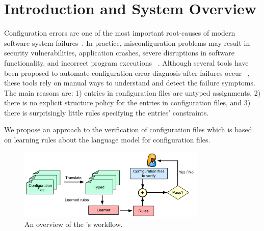 \section{Introduction and System Overview}
\label{sec:Intro}

Configuration errors are one of the most important root-causes of 
modern software system failures~\cite{xu15systems,yin11anempirical}. 
In practice, misconfiguration problems may result in 
security vulnerabilities,
application crashes, severe disruptions in software functionality,
and incorrect program executions%
~\cite{xu15systems,zhang14encore,yuan11context}.
Although several tools have been proposed to automate configuration
error diagnosis after failures occur%
~\cite{wang04automatic,attariyan10automating,%
su07autobash,whitaker04configuration}, 
these tools rely on manual ways to understand and detect the failure 
symptoms. The main reasons are:
1) entries in configuration files are untyped assignments, 
2) there is no explicit structure policy for the entries in 
configuration files, and 3) there is surprisingly little rules 
specifying the entries' constraints.

We propose an approach to the verification of  
configuration files which is based on learning rules about the language 
model for configuration files. 

\begin{figure}[t] \centering
\includegraphics[width=0.8\textwidth]{figs/overview}
\caption{An overview of the \app's workflow.}
\label{fig-overview}
\end{figure}

